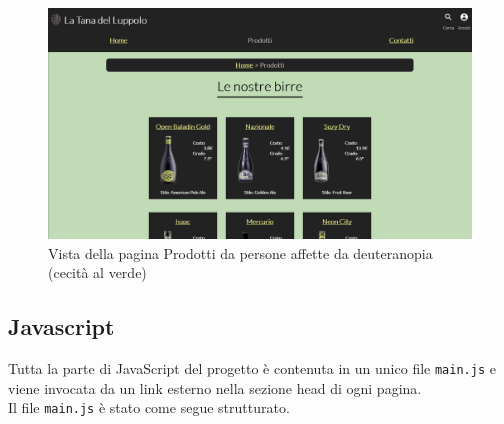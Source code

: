 \begin{figure}[H]
	\centering
	\includegraphics[width=16cm]{utility/prodotti_deuteranopia.png}
	\caption{Vista della pagina Prodotti da persone affette da deuteranopia (cecità al verde)}
\end{figure}


\subsection{Javascript}
Tutta la parte di JavaScript del progetto è contenuta in un unico file \verb|main.js| e viene invocata da un link esterno nella sezione head di ogni pagina. \\
Il file \verb|main.js| è stato come segue strutturato.
